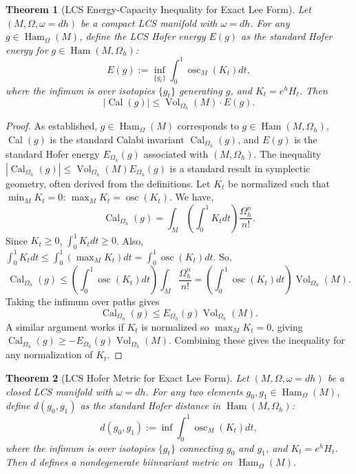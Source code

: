 \documentclass[11pt,a4paper]{amsart}
\newtheorem{theorem}{Theorem}[section]
\theoremstyle{definition}
\theoremstyle{remark}
\newcommand{\Ham}{\operatorname{Ham}}
\newcommand{\Vol}{\operatorname{Vol}}
\newcommand{\osc}{\operatorname{osc}}
\newcommand{\Cal}{\operatorname{Cal}}
\begin{document}
	\begin{theorem}[LCS Energy-Capacity Inequality for Exact Lee Form] \label{thm:energy_exact}
		Let $(M, \Omega, \omega = dh)$ be a compact LCS manifold with $\omega = dh$. For any $g \in \Ham_\Omega(M)$, define the LCS Hofer energy $E(g)$ as the standard Hofer energy for $g \in \Ham(M, \Omega_h)$:
		\[
		E(g) := \inf_{\{g_t\}} \int_0^1 \osc_M(K_t) dt,
		\]
		where the infimum is over isotopies $\{g_t\}$ generating $g$, and $K_t = e^h H_t$. Then
		\[
		|\Cal(g)| \leq \Vol_{\Omega_h}(M) \cdot E(g).
		\]
	\end{theorem}
	
	\begin{proof}
		As established, $g \in \Ham_\Omega(M)$ corresponds to $g \in \Ham(M, \Omega_h)$, $\Cal(g)$ is the standard Calabi invariant $\Cal_{\Omega_h}(g)$, and $E(g)$ is the standard Hofer energy $E_{\Omega_h}(g)$ associated with $(M, \Omega_h)$. The inequality $|\Cal_{\Omega_h}(g)| \leq \Vol_{\Omega_h}(M) E_{\Omega_h}(g)$ is a standard result in symplectic geometry, often derived from the definitions. Let $K_t$ be normalized such that $\min_M K_t = 0$: $\max_M K_t = \osc(K_t)$. We have,
		\[
		\Cal_{\Omega_h}(g) = \int_M \left( \int_0^1 K_t dt \right) \frac{\Omega_h^n}{n!}.
		\]
		Since $K_t \geq 0$, $\int_0^1 K_t dt \geq 0$. Also, $\int_0^1 K_t dt \leq \int_0^1 (\max_M K_t) dt = \int_0^1 \osc(K_t) dt$. So,
		\[
		\Cal_{\Omega_h}(g) \leq \left( \int_0^1 \osc(K_t) dt \right) \int_M \frac{\Omega_h^n}{n!} = \left( \int_0^1 \osc(K_t) dt \right) \Vol_{\Omega_h}(M).
		\]
		Taking the infimum over paths gives
		\[
		\Cal_{\Omega_h}(g) \leq E_{\Omega_h}(g) \Vol_{\Omega_h}(M).
		\]
		A similar argument works if $K_t$ is normalized so $\max_M K_t = 0$, giving $\Cal_{\Omega_h}(g) \geq -E_{\Omega_h}(g) \Vol_{\Omega_h}(M)$. Combining these gives the inequality for any normalization of $K_t$.
	\end{proof}
	
	\begin{theorem}[LCS Hofer Metric for Exact Lee Form] \label{thm:hofer_exact}
		Let $(M, \Omega, \omega = dh)$ be a closed LCS manifold with $\omega = dh$. For any two elements $g_0, g_1 \in \Ham_\Omega(M)$, define $d(g_0, g_1)$ as the standard Hofer distance in $\Ham(M, \Omega_h)$:
		\[
		d(g_0, g_1) := \inf \int_0^1 \osc_M(K_t) dt,
		\]
		where the infimum is over isotopies $\{g_t\}$ connecting $g_0$ and $g_1$, and $K_t = e^h H_t$. Then $d$ defines a nondegenerate biinvariant metric on $\Ham_\Omega(M)$.
	\end{theorem}
	
\end{document}
